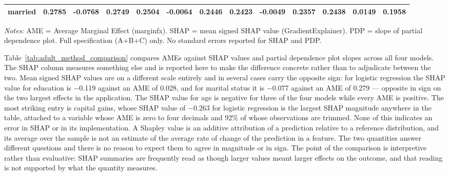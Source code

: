\documentclass[12pt]{article}
\begin{document}
\begin{table}
\begin{threeparttable}
\begin{tabular}{lrrrrrrrrrrrr}
				married & 0.2785 & -0.0768 & 0.2749 & 0.2504 & -0.0064 & 0.2446 & 0.2423 & -0.0049 & 0.2357 & 0.2438 & 0.0149 & 0.1958 \\
				\bottomrule
				\end{tabular}
				\begin{tablenotes}
				\footnotesize
				\item \textit{Notes:} AME = Average Marginal Effect (marginfx). SHAP = mean signed SHAP value (GradientExplainer). PDP = slope of partial dependence plot. Full specification (A+B+C) only. No standard errors reported for SHAP and PDP.
				\end{tablenotes}
		\end{threeparttable}
	\end{table}
	
	Table~\ref{tab:adult_method_comparison} compares AMEs against SHAP values and partial dependence plot slopes across all four models. The SHAP column measures something else and is reported here to make the difference concrete rather than to adjudicate between the two. Mean signed SHAP values are on a different scale entirely and in several cases carry the opposite sign: for logistic regression the SHAP value for education is $-$0.119 against an AME of 0.028, and for marital status it is $-$0.077 against an AME of 0.279 --- opposite in sign on the two largest effects in the application. The SHAP value for age is negative for three of the four models while every AME is positive. The most striking entry is capital gains, whose SHAP value of $-$0.263 for logistic regression is the largest SHAP magnitude anywhere in the table, attached to a variable whose AME is zero to four decimals and 92\% of whose observations are trimmed. None of this indicates an error in SHAP or in its implementation. A Shapley value is an additive attribution of a prediction relative to a reference distribution, and its average over the sample is not an estimate of the average rate of change of the prediction in a feature. The two quantities answer different questions and there is no reason to expect them to agree in magnitude or in sign. The point of the comparison is interpretive rather than evaluative: SHAP summaries are frequently read as though larger values meant larger effects on the outcome, and that reading is not supported by what the quantity measures.
\end{document}
